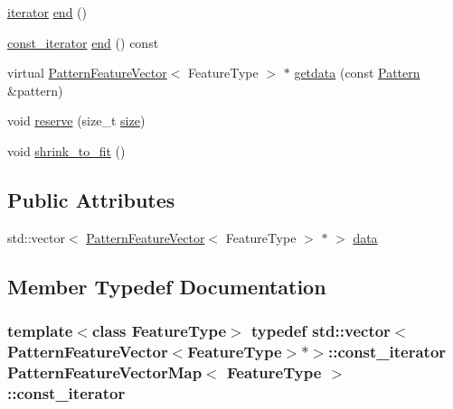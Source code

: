 \begin{DoxyCompactItemize}
\item 
\hyperlink{classPatternFeatureVectorMap_a1c80bb683efdee17443a5b951412ddd3}{iterator} \hyperlink{classPatternFeatureVectorMap_ac19308fec657ab0d40f9379a4df59d56}{end} ()
\item 
\hyperlink{classPatternFeatureVectorMap_ae7d2f49b99e49834acbc799a0660cb18}{const\+\_\+iterator} \hyperlink{classPatternFeatureVectorMap_a4da010d37dfdd0bc42e752d2e282942b}{end} () const 
\item 
virtual \hyperlink{classPatternFeatureVector}{Pattern\+Feature\+Vector}$<$ Feature\+Type $>$ $\ast$ \hyperlink{classPatternFeatureVectorMap_ad89fc79a2d663bee2e3fd3670f3da956}{getdata} (const \hyperlink{classPattern}{Pattern} \&pattern)
\item 
void \hyperlink{classPatternFeatureVectorMap_a63d6aa6a1866aa900765bdbe70be3a55}{reserve} (size\+\_\+t \hyperlink{classPatternFeatureVectorMap_a886aeabb1db572b24b156288af3e9779}{size})
\item 
void \hyperlink{classPatternFeatureVectorMap_aa6333ce6acb01124ab3f8485b0d46aa2}{shrink\+\_\+to\+\_\+fit} ()
\end{DoxyCompactItemize}
\subsection*{Public Attributes}
\begin{DoxyCompactItemize}
\item 
std\+::vector$<$ \hyperlink{classPatternFeatureVector}{Pattern\+Feature\+Vector}$<$ Feature\+Type $>$ $\ast$ $>$ \hyperlink{classPatternFeatureVectorMap_aa07d43ae4f1c409ae7ceb903d826cf6f}{data}
\end{DoxyCompactItemize}


\subsection{Member Typedef Documentation}
\hypertarget{classPatternFeatureVectorMap_ae7d2f49b99e49834acbc799a0660cb18}{}
\subsubsection[{const\+\_\+iterator}]{\setlength{\rightskip}{0pt plus 5cm}template$<$class Feature\+Type$>$ typedef std\+::vector$<${\bf Pattern\+Feature\+Vector}$<$Feature\+Type$>$$\ast$$>$\+::{\bf const\+\_\+iterator} {\bf Pattern\+Feature\+Vector\+Map}$<$ Feature\+Type $>$\+::{\bf const\+\_\+iterator}}\label{classPatternFeatureVectorMap_ae7d2f49b99e49834acbc799a0660cb18}
\hypertarget{classPatternFeatureVectorMap_a1c80bb683efdee17443a5b951412ddd3}{}
